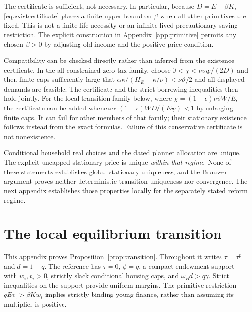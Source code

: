 \documentclass[11pt]{article}
\newcommand{\tht}{\vartheta}
\begin{document}
The certificate is sufficient, not necessary. In particular, because $D=E+\beta K$, \eqref{eq:existcertificate} places a finite upper bound on $\beta$ when all other primitives are fixed. This is not a finite-life necessity or an infinite-lived precautionary-saving restriction. The explicit construction in Appendix~\ref{app:primitive} permits any chosen $\beta>0$ by adjusting old income and the positive-price condition.

Compatibility can be checked directly rather than inferred from the existence certificate. In the all-constrained zero-tax family, choose $0<\chi<\nu\tht\underline w/(2D)$ and then finite caps sufficiently large that $\alpha\kappa/(H_R-\kappa/\nu)<\nu\tht/2$ and all displayed demands are feasible. The certificate and the strict borrowing inequalities then hold jointly. For the local-transition family below, where $\chi=(1-\epsilon)\nu\tht W/E$, the certificate can be added whenever $(1-\epsilon)WD/(E\underline w)<1$ by enlarging finite caps. It can fail for other members of that family; their stationary existence follows instead from the exact formulas. Failure of this conservative certificate is not nonexistence.

Conditional household real choices and the dated planner allocation are unique. The explicit uncapped stationary price is unique \emph{within that regime}. None of these statements establishes global stationary uniqueness, and the Brouwer argument proves neither deterministic transition uniqueness nor convergence. The next appendix establishes those properties locally for the separately stated reform regime.
\clearpage
\section{The local equilibrium transition}\label{app:transition}
This appendix proves Proposition~\ref{prop:transition}. Throughout it writes $\tau=\tau^p$ and $d=1-q$. The reference has $\tau=0$, $\phi=q$, a compact endowment support with $w_i,v_i>0$, strictly slack conditional housing caps, and $\omega_Bd>q\gamma$. Strict inequalities on the support provide uniform margins. The primitive restriction $qEv_i>\beta Kw_i$ implies strictly binding young finance, rather than assuming its multiplier is positive.
\end{document}
